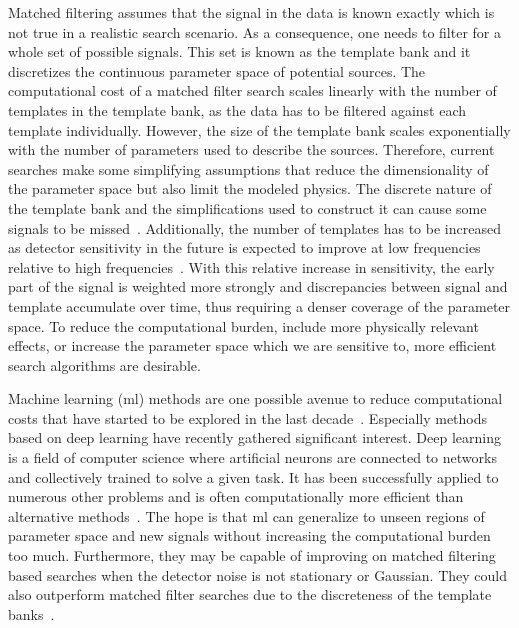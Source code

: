 Matched filtering assumes that the signal in the data is known exactly which is not true in a realistic search scenario. As a consequence, one needs to filter for a whole set of possible signals. This set is known as the template bank and it discretizes the continuous parameter space of potential sources. The computational cost of a matched filter search scales linearly with the number of templates in the template bank, as the data has to be filtered against each template individually. However, the size of the template bank scales exponentially with the number of parameters used to describe the sources. Therefore, current searches make some simplifying assumptions that reduce the dimensionality of the parameter space but also limit the modeled physics. The discrete nature of the template bank and the simplifications used to construct it can cause some signals to be missed~\cite{Harry:2016ijz, Harry:2017weg, CalderonBustillo:2016rlt, Chandra:2022ixv, Dhurkunde:2022aek}. Additionally, the number of templates has to be increased as detector sensitivity in the future is expected to improve at low frequencies relative to high frequencies~\cite{KAGRA:2018plz, LIGOScientific:2017aaa, Maggiore:2019uih, Reitze:2019iox}. With this relative increase in sensitivity, the early part of the signal is weighted more strongly and discrepancies between signal and template accumulate over time, thus requiring a denser coverage of the parameter space. To reduce the computational burden, include more physically relevant effects, or increase the parameter space which we are sensitive to, more efficient search algorithms are desirable.

Machine learning (\acrshort{ml}) methods are one possible avenue to reduce computational costs that have started to be explored in the last decade~\cite{Cuoco:2020ogp}. Especially methods based on deep learning have recently gathered significant interest. Deep learning is a field of computer science where artificial neurons are connected to networks and collectively trained to solve a given task. It has been successfully applied to numerous other problems and is often computationally more efficient than alternative methods~\cite{krizhevsky:2012, Ren:2015aaa, openai:2019}. The hope is that \acrshort{ml} can generalize to unseen regions of parameter space and new signals without increasing the computational burden too much. Furthermore, they may be capable of improving on matched filtering based searches when the detector noise is not stationary or Gaussian. They could also outperform matched filter searches due to the discreteness of the template banks~\cite{Prix:2009tq, Baker:2014eba, Yan:2021wml}.

